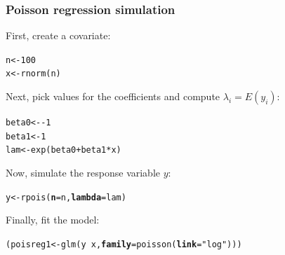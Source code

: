 \documentclass[color=usenames,dvipsnames]{beamer}\usepackage[]{graphicx}\usepackage[]{xcolor}
\makeatletter
\newcommand{\hlnum}[1]{\textcolor[rgb]{0.69,0.494,0}{#1}}%
\newcommand{\hlsng}[1]{\textcolor[rgb]{0.749,0.012,0.012}{#1}}%
\newcommand{\hlopt}[1]{\textcolor[rgb]{0,0,0}{#1}}%
\newcommand{\hldef}[1]{\textcolor[rgb]{0,0,0}{#1}}%
\newcommand{\hlkwb}[1]{\textcolor[rgb]{0,0.341,0.682}{#1}}%
\newcommand{\hlkwc}[1]{\textcolor[rgb]{0,0,0}{\textbf{#1}}}%
\newcommand{\hlkwd}[1]{\textcolor[rgb]{0.004,0.004,0.506}{#1}}%
\newenvironment{kframe}{%
 \def\at@end@of@kframe{}%
 \ifinner\ifhmode%
  \def\at@end@of@kframe{\end{minipage}}%
  \begin{minipage}{\columnwidth}%
 \fi\fi%
 \def\FrameCommand##1{\hskip\@totalleftmargin \hskip-\fboxsep
 \colorbox{shadecolor}{##1}\hskip-\fboxsep
     \hskip-\linewidth \hskip-\@totalleftmargin \hskip\columnwidth}%
 \MakeFramed {\advance\hsize-\width
   \@totalleftmargin\z@ \linewidth\hsize
   \@setminipage}}%
 {\par\unskip\endMakeFramed%
 \at@end@of@kframe}
\newenvironment{knitrout}{}{} %
\makeatother
\begin{document}
\begin{frame}[fragile]
  \frametitle{Poisson regression simulation}
  \small
  First, create a covariate:
\begin{knitrout}
\color{fgcolor}\begin{kframe}
\begin{alltt}
\hldef{n} \hlkwb{<-} \hlnum{100}
\hldef{x} \hlkwb{<-} \hlkwd{rnorm}\hldef{(n)}
\end{alltt}
\end{kframe}
\end{knitrout}
  Next, pick values for the coefficients and compute $\lambda_i =
  E(y_i)$:
\begin{knitrout}
\color{fgcolor}\begin{kframe}
\begin{alltt}
\hldef{beta0} \hlkwb{<-} \hlopt{-}\hlnum{1}
\hldef{beta1} \hlkwb{<-} \hlnum{1}
\hldef{lam} \hlkwb{<-} \hlkwd{exp}\hldef{(beta0} \hlopt{+} \hldef{beta1}\hlopt{*}\hldef{x)}
\end{alltt}
\end{kframe}
\end{knitrout}
Now, simulate the response variable $y$:
\begin{knitrout}
\color{fgcolor}\begin{kframe}
\begin{alltt}
\hldef{y} \hlkwb{<-} \hlkwd{rpois}\hldef{(}\hlkwc{n}\hldef{=n,} \hlkwc{lambda}\hldef{=lam)}
\end{alltt}
\end{kframe}
\end{knitrout}
Finally, fit the model:
\begin{knitrout}\small
{}\color{fgcolor}\begin{kframe}
\begin{alltt}
\hldef{(poisreg1} \hlkwb{<-} \hlkwd{glm}\hldef{(y} \hlopt{~} \hldef{x,} \hlkwc{family}\hldef{=}\hlkwd{poisson}\hldef{(}\hlkwc{link}\hldef{=}\hlsng{"log"}\hldef{)))}
\end{alltt}
\end{kframe}
\end{knitrout}
\end{frame}
\end{document}
